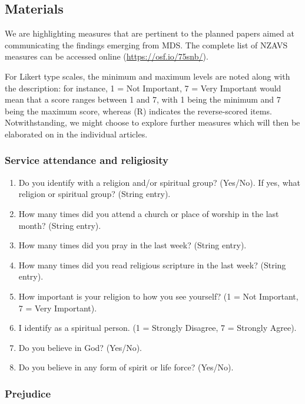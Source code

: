 \documentclass[
]{interact}
\providecommand{\tightlist}{%
  \setlength{\itemsep}{0pt}\setlength{\parskip}{0pt}}\usepackage{longtable,booktabs,array}
\begin{document}
\subsection{Materials}\label{materials}

We are highlighting measures that are pertinent to the planned papers
aimed at communicating the findings emerging from MDS. The complete list
of NZAVS measures can be accessed online (\url{https://osf.io/75snb/}).

For Likert type scales, the minimum and maximum levels are noted along
with the description: for instance, 1 = Not Important, 7 = Very
Important would mean that a score ranges between 1 and 7, with 1 being
the minimum and 7 being the maximum score, whereas (R) indicates the
reverse-scored items. Notwithstanding, we might choose to explore
further measures which will then be elaborated on in the individual
articles.

\subsubsection{Service attendance and
religiosity}\label{service-attendance-and-religiosity}

\begin{enumerate}
\def\labelenumi{\arabic{enumi}.}
\tightlist
\item
  Do you identify with a religion and/or spiritual group? (Yes/No). If
  yes, what religion or spiritual group? (String entry).
\item
  How many times did you attend a church or place of worship in the last
  month? (String entry).
\item
  How many times did you pray in the last week? (String entry).
\item
  How many times did you read religious scripture in the last week?
  (String entry).
\item
  How important is your religion to how you see yourself? (1 = Not
  Important, 7 = Very Important).
\item
  I identify as a spiritual person. (1 = Strongly Disagree, 7 = Strongly
  Agree).
\item
  Do you believe in God? (Yes/No).
\item
  Do you believe in any form of spirit or life force? (Yes/No).
\end{enumerate}

\subsubsection{Prejudice}\label{prejudice}
\end{document}
